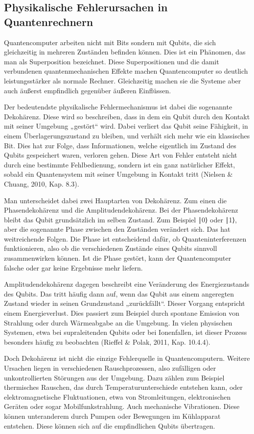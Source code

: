 \subsection{Physikalische Fehlerursachen in Quantenrechnern}
Quantencomputer arbeiten nicht mit Bits sondern mit Qubits, die sich gleichzeitig in mehreren Zuständen befinden können. Dies ist ein Phänomen, das man als Superposition bezeichnet. Diese Superpositionen und die damit verbundenen quantenmechanischen Effekte machen Quantencomputer so deutlich leistungsstärker als normale Rechner. Gleichzeitig machen sie die Systeme aber auch äußerst empfindlich gegenüber äußeren Einflüssen.

Der bedeutendste physikalische Fehlermechanismus ist dabei die sogenannte Dekohärenz. Diese wird so beschreiben, dass in dem ein Qubit durch den Kontakt mit seiner Umgebung „gestört“ wird. Dabei verliert das Qubit seine Fähigkeit, in einem Überlagerungszustand zu bleiben, und verhält sich mehr wie ein klassisches Bit. Dies hat zur Folge, dass Informationen, welche eigentlich im Zustand des Qubits gespeichert waren, verloren gehen. Diese Art von Fehler entsteht nicht durch eine bestimmte Fehlbedienung, sondern ist ein ganz natürlicher Effekt, sobald ein Quantensystem mit seiner Umgebung in Kontakt tritt (Nielsen & Chuang, 2010, Kap. 8.3).

Man unterscheidet dabei zwei Hauptarten von Dekohärenz. Zum einen die Phasendekohärenz und die Amplitudendekohärenz. Bei der Phasendekohärenz bleibt das Qubit grundsätzlich im selben Zustand. Zum Beispiel 
∣0⟩ oder ∣1⟩,
aber die sogenannte Phase zwischen den Zuständen verändert sich. Das hat  weitreichende Folgen. Die Phase ist entscheidend dafür, ob Quanteninterferenzen funktionieren, also ob die verschiedenen Zustände eines Qubits sinnvoll zusammenwirken können. Ist die Phase gestört, kann der Quantencomputer falsche oder gar keine Ergebnisse mehr liefern.

Amplitudendekohärenz dagegen beschreibt eine Veränderung des Energiezustands des Qubits. Das tritt häufig dann auf, wenn das Qubit aus einem angeregten Zustand wieder in seinen Grundzustand „zurückfällt“. Dieser Vorgang entspricht einem Energieverlust. Dies passiert zum Beispiel durch spontane Emission von Strahlung oder durch Wärmeabgabe an die Umgebung. In vielen physischen Systemen, etwa bei supraleitenden Qubits oder bei Ionenfallen, ist dieser Prozess besonders häufig zu beobachten (Rieffel & Polak, 2011, Kap. 10.4.4).

Doch Dekohärenz ist nicht die einzige Fehlerquelle in Quantencomputern. Weitere Ursachen liegen in verschiedenen Rauschprozessen, also zufälligen oder unkontrollierten Störungen aus der Umgebung. Dazu zählen zum Beispiel thermisches Rauschen, das durch Temperaturunterschiede entstehen kann, oder elektromagnetische Fluktuationen, etwa von Stromleitungen, elektronischen Geräten oder sogar Mobilfunkstrahlung. Auch mechanische Vibrationen. Diese können unteranderem durch Pumpen oder Bewegungen im Kühlapparat entstehen. Diese können sich auf die empfindlichen Qubits übertragen.

